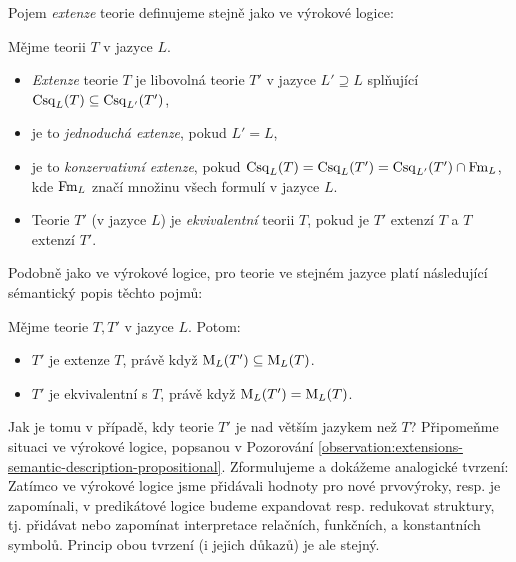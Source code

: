 Pojem \emph{extenze} teorie definujeme stejně jako ve výrokové logice:

\begin{definition}
    Mějme teorii $T$ v jazyce $L$.
    \begin{itemize}
        \item \emph{Extenze} teorie $T$ je libovolná teorie $T'$ v jazyce $L'\supseteq L$ splňující $\operatorname{Csq}_L(T)\subseteq\operatorname{Csq}_{L'}(T')$,
        \item je to \emph{jednoduchá extenze}, pokud $L'=L$,
        \item je to \emph{konzervativní extenze}, pokud $\operatorname{Csq}_L(T)=\operatorname{Csq}_L(T')=\operatorname{Csq}_{L'}(T')\cap \operatorname{Fm}_L$, kde $\operatorname{Fm}_L$ značí množinu všech formulí v jazyce $L$.
        \item Teorie $T'$ (v jazyce $L$) je \emph{ekvivalentní} teorii $T$, pokud je $T'$ extenzí $T$ a $T$ extenzí $T'$.
    \end{itemize}
\end{definition}

Podobně jako ve výrokové logice, pro teorie ve stejném jazyce platí následující sémantický popis těchto pojmů:

\begin{observation}
Mějme teorie $T,T'$ v jazyce $L$. Potom:
\begin{itemize}
    \item $T'$ je extenze $T$, právě když $\operatorname{M}_L(T')\subseteq\operatorname{M}_L(T)$.
    \item $T'$ je ekvivalentní s $T$, právě když $\operatorname{M}_L(T')=\operatorname{M}_L(T)$.
\end{itemize}
\end{observation}

Jak je tomu v případě, kdy teorie $T'$ je nad větším jazykem než $T$? Připomeňme situaci ve výrokové logice, popsanou v Pozorování \ref{observation:extensions-semantic-description-propositional}. Zformulujeme a dokážeme analogické tvrzení: Zatímco ve výrokové logice jsme přidávali hodnoty pro nové prvovýroky, resp. je zapomínali, v predikátové logice budeme expandovat resp. redukovat struktury, tj. přidávat nebo zapomínat interpretace relačních, funkčních, a konstantních symbolů. Princip obou tvrzení (i jejich důkazů) je ale stejný.

